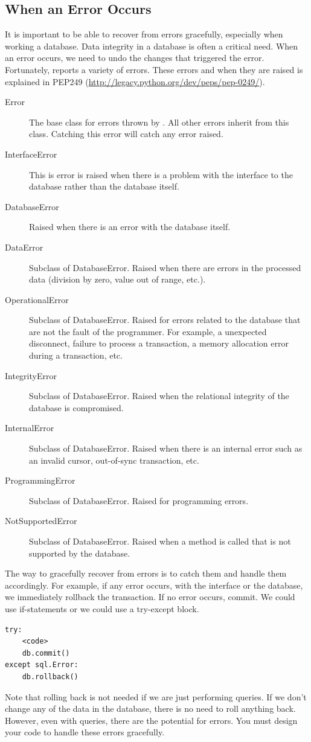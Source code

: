\subsection*{When an Error Occurs}
It is important to be able to recover from errors gracefully, especially when working a database.
Data integrity in a database is often a critical need.
When an error occurs, we need to undo the changes that triggered the error.
Fortunately,  reports a variety of errors.
These errors and when they are raised is explained in PEP249 (\url{http://legacy.python.org/dev/peps/pep-0249/}).
\begin{description}
\item[Error] The base class for errors thrown by .  All other errors inherit from this class.  Catching this error will catch any error raised.
\item[InterfaceError] This is error is raised when there is a problem with the interface to the database rather than the database itself.
\item[DatabaseError] Raised when there is an error with the database itself.
\item[DataError] Subclass of DatabaseError.  Raised when there are errors in the processed data (division by zero, value out of range, etc.).
\item[OperationalError] Subclass of DatabaseError. Raised for errors related to the database that are not the fault of the programmer.  For example, a unexpected disconnect, failure to process a transaction, a memory allocation error during a transaction, etc.
\item[IntegrityError] Subclass of DatabaseError.  Raised when the relational integrity of the database is compromised.
\item[InternalError] Subclass of DatabaseError. Raised when there is an internal error such as an invalid cursor, out-of-sync transaction, etc.
\item[ProgrammingError] Subclass of DatabaseError.  Raised for programming errors.
\item[NotSupportedError] Subclass of DatabaseError.  Raised when a method is called that is not supported by the database.
\end{description}

The way to gracefully recover from errors is to catch them and handle them accordingly.  For example, if any error occurs, with the interface or the database, we immediately rollback the transaction.  If no error occurs, commit.  We could use if-statements or we could use a try-except block.
\begin{lstlisting}
try:
    <code>
    db.commit()
except sql.Error:
    db.rollback()
\end{lstlisting}
Note that rolling back is not needed if we are just performing queries.
If we don't change any of the data in the database, there is no need to roll anything back.  However, even with queries, there are the potential for errors.  You must design your code to handle these errors gracefully.

